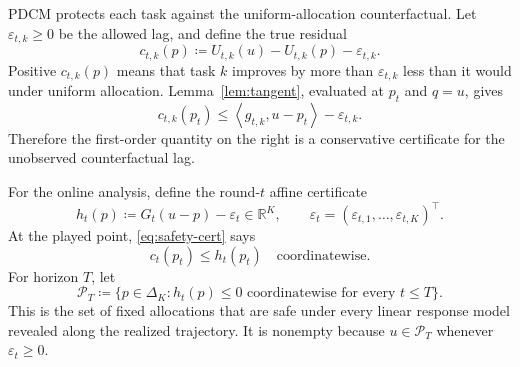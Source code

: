 \documentclass[11pt]{article}
\newcommand{\R}{\mathbb{R}}
\newcommand{\DeltaK}{\Delta_K}
\newcommand{\ip}[2]{\left\langle #1,#2\right\rangle}
\begin{document}
PDCM protects each task against the uniform-allocation counterfactual. Let $\varepsilon_{t,k}\ge0$ be the allowed lag, and define the true residual
\begin{equation}
    c_{t,k}(p)
    \coloneqq
    U_{t,k}(u)-U_{t,k}(p)-\varepsilon_{t,k}.
    \label{eq:true-residual}
\end{equation}
Positive $c_{t,k}(p)$ means that task $k$ improves by more than $\varepsilon_{t,k}$ less than it would under uniform allocation. Lemma~\ref{lem:tangent}, evaluated at $p_t$ and $q=u$, gives
\begin{equation}
    c_{t,k}(p_t)
    \le
    \ip{g_{t,k}}{u-p_t}-\varepsilon_{t,k}.
    \label{eq:safety-cert}
\end{equation}
Therefore the first-order quantity on the right is a conservative certificate for the unobserved counterfactual lag.

For the online analysis, define the round-$t$ affine certificate
\begin{equation}
    h_t(p)
    \coloneqq
    G_t(u-p)-\varepsilon_t\in\R^K,
    \qquad
    \varepsilon_t=(\varepsilon_{t,1},\ldots,\varepsilon_{t,K})^\top.
    \label{eq:h}
\end{equation}
At the played point, \eqref{eq:safety-cert} says
\begin{equation}
    c_t(p_t)\le h_t(p_t)
    \quad\text{coordinatewise}.
    \label{eq:true-vs-h}
\end{equation}
For horizon $T$, let
\begin{equation}
    \mathcal P_T
    \coloneqq
    \{p\in\DeltaK:h_t(p)\le0\text{ coordinatewise for every }t\le T\}.
    \label{eq:PT}
\end{equation}
This is the set of fixed allocations that are safe under every linear response model revealed along the realized trajectory. It is nonempty because $u\in\mathcal P_T$ whenever $\varepsilon_t\ge0$.
\end{document}

